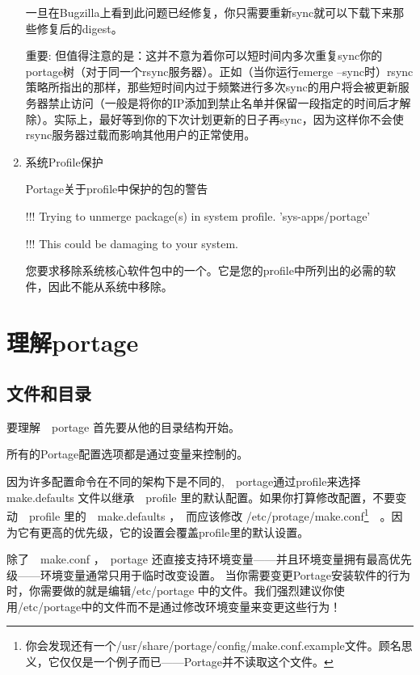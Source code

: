 \begin{enumerate}
一旦在Bugzilla上看到此问题已经修复，你只需要重新sync就可以下载下来那些修复后的digest。

\begin{notice}
重要: 但值得注意的是：这并不意为着你可以短时间内多次重复sync你的portage树（对于同一个rsync服务器）。正如（当你运行emerge --sync时）rsync策略所指出的那样，那些短时间内过于频繁进行多次sync的用户将会被更新服务器禁止访问（一般是将你的IP添加到禁止名单并保留一段指定的时间后才解除）。实际上，最好等到你的下次计划更新的日子再sync，因为这样你不会使rsync服务器过载而影响其他用户的正常使用。
\end{notice}


\item 系统Profile保护

\begin{example}{Portage关于profile中保护的包的警告}
\begin{code}
!!! Trying to unmerge package(s) in system profile. 'sys-apps/portage'

!!! This could be damaging to your system.
\end{code}
\end{example}

您要求移除系统核心软件包中的一个。它是您的profile中所列出的必需的软件，因此不能从系统中移除。

\end{enumerate}

\section{理解portage}

\subsection{文件和目录}

要理解　portage 首先要从他的目录结构开始。

所有的Portage配置选项都是通过变量来控制的。

因为许多配置命令在不同的架构下是不同的,　portage通过profile来选择　make.defaults 文件以继承　profile 里的默认配置。如果你打算修改配置，不要变动　profile 里的　make.defaults ，　而应该修改 /etc/protage/make.conf\footnote{你会发现还有一个/usr/share/portage/config/make.conf.example文件。顾名思义，它仅仅是一个例子而已——Portage并不读取这个文件。}　。因为它有更高的优先级，它的设置会覆盖profile里的默认设置。

除了　make.conf ，　portage 还直接支持环境变量——并且环境变量拥有最高优先级——环境变量通常只用于临时改变设置。
当你需要变更Portage安装软件的行为时，你需要做的就是编辑/etc/portage 中的文件。我们强烈建议你使用/etc/portage中的文件而不是通过修改环境变量来变更这些行为！


